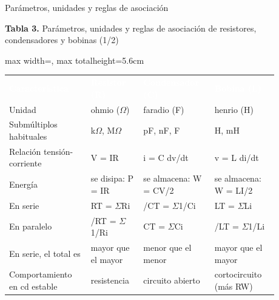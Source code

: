 \documentclass[aspectratio=169,11pt,xcolor={table}]{beamer}
\begin{document}
\begin{frame}{Parámetros, unidades y reglas de asociación}
\begin{center}
{\scriptsize\textbf{Tabla 3.} Parámetros, unidades y reglas de asociación de resistores, condensadores y bobinas (1/2)\par}
\vspace{1mm}
\scriptsize
\renewcommand{\arraystretch}{1.35}
\begin{adjustbox}{max width=\linewidth, max totalheight=5.6cm}
\begin{tabular}{>{\raggedright\arraybackslash}p{0.271\linewidth}>{\raggedright\arraybackslash}p{0.178\linewidth}>{\raggedright\arraybackslash}p{0.215\linewidth}>{\raggedright\arraybackslash}p{0.215\linewidth}}
\rowcolor{iubnavy} \textcolor{white}{\textbf{Característica}} & \textcolor{white}{\textbf{Resistor (R)}} & \textcolor{white}{\textbf{Condensador (C)}} & \textcolor{white}{\textbf{Bobina (L)}} \\
Unidad & ohmio (\ensuremath{\Omega}) & faradio (F) & henrio (H) \\
\rowcolor{iubfondogris} Submúltiplos habituales & k\ensuremath{\Omega}, M\ensuremath{\Omega} & pF, nF, \textmu{}F & \textmu{}H, mH \\
Relación tensión-corriente & V = IR & i = C dv/dt & v = L di/dt \\
\rowcolor{iubfondogris} Energía & se disipa: P = I\texttwosuperior{}R & se almacena: W = CV\texttwosuperior{}/2 & se almacena: W = LI\texttwosuperior{}/2 \\
En serie & RT = \ensuremath{\Sigma}Ri & 1/CT = \ensuremath{\Sigma}1/Ci & LT = \ensuremath{\Sigma}Li \\
\rowcolor{iubfondogris} En paralelo & 1/RT = \ensuremath{\Sigma}1/Ri & CT = \ensuremath{\Sigma}Ci & 1/LT = \ensuremath{\Sigma}1/Li \\
En serie, el total es & mayor que el mayor & menor que el menor & mayor que el mayor \\
\rowcolor{iubfondogris} Comportamiento en cd estable & resistencia & circuito abierto & cortocircuito (más RW) \\
\bottomrule
\end{tabular}
\end{adjustbox}
\end{center}
\end{frame}
\end{document}
